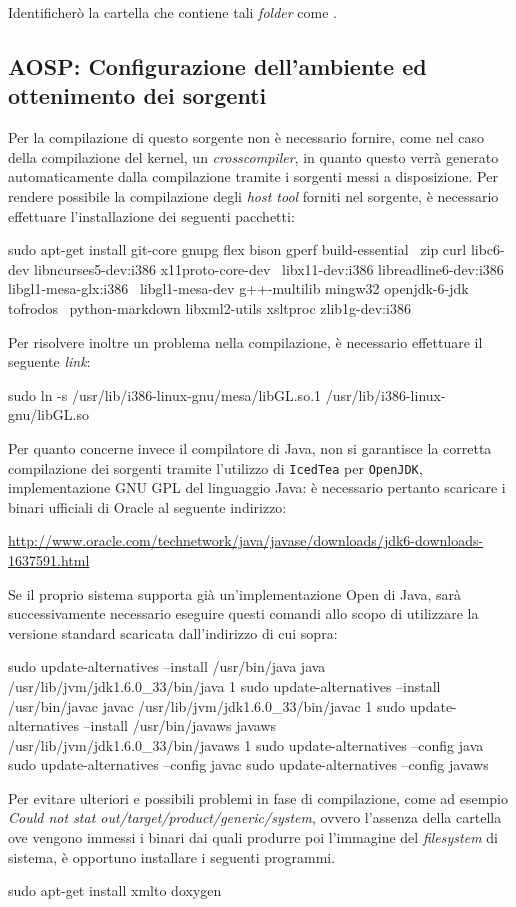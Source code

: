 Identificherò la cartella che contiene tali \textit{folder} come \AOSP.
 
\subsection{AOSP: Configurazione dell'ambiente ed ottenimento dei sorgenti}
Per la compilazione di questo sorgente non è necessario fornire, come nel caso 
della compilazione del kernel,  un \textit{crosscompiler}, in quanto questo verrà generato
automaticamente dalla compilazione tramite i sorgenti messi a disposizione. Per
rendere possibile la compilazione degli \textit{host tool} forniti nel sorgente, è 
necessario effettuare l'installazione dei seguenti pacchetti:
\begin{bash}
sudo apt-get install git-core gnupg flex bison gperf build-essential \
  zip curl libc6-dev libncurses5-dev:i386 x11proto-core-dev \
  libx11-dev:i386 libreadline6-dev:i386 libgl1-mesa-glx:i386 \
  libgl1-mesa-dev g++-multilib mingw32 openjdk-6-jdk tofrodos \
  python-markdown libxml2-utils xsltproc zlib1g-dev:i386
\end{bash}
Per risolvere inoltre un problema nella compilazione, è necessario effettuare il
seguente \textit{link}:
\begin{bash}
sudo ln -s /usr/lib/i386-linux-gnu/mesa/libGL.so.1 /usr/lib/i386-linux-gnu/libGL.so
\end{bash}

Per quanto concerne invece il compilatore di Java, non si garantisce la corretta 
compilazione dei sorgenti tramite l'utilizzo di \texttt{IcedTea} per \texttt{OpenJDK},
implementazione GNU GPL del linguaggio Java: è necessario pertanto scaricare 
i binari ufficiali di Oracle al seguente indirizzo:
\begin{center}
\small
\url{http://www.oracle.com/technetwork/java/javase/downloads/jdk6-downloads-1637591.html}
\end{center}

Se il proprio sistema supporta già un'implementazione Open di Java, sarà successivamente
necessario eseguire questi comandi allo scopo di utilizzare la versione standard
scaricata dall'indirizzo di cui sopra:
\begin{bash}
sudo update-alternatives --install /usr/bin/java java /usr/lib/jvm/jdk1.6.0_33/bin/java 1
sudo update-alternatives --install /usr/bin/javac javac /usr/lib/jvm/jdk1.6.0_33/bin/javac 1
sudo update-alternatives --install /usr/bin/javaws javaws /usr/lib/jvm/jdk1.6.0_33/bin/javaws 1
sudo update-alternatives --config java
sudo update-alternatives --config javac
sudo update-alternatives --config javaws
\end{bash}
Per evitare ulteriori e possibili problemi in fase di compilazione, come ad 
esempio \textit{Could not stat out/target/product/generic/system}, ovvero l'assenza della cartella
ove vengono immessi i binari dai quali produrre poi l'immagine del \textit{filesystem}
di sistema, è opportuno installare i seguenti programmi.
\begin{bash}
sudo apt-get install xmlto doxygen
\end{bash}
\medskip


